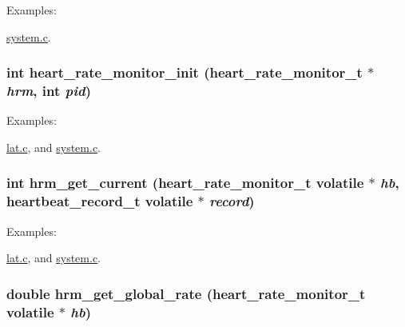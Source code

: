 \begin{Desc}
\item[Examples: ]\par
\hyperlink{system_8c-example}{system.c}.\end{Desc}
\hypertarget{heart__rate__monitor-file_8c_d49db9e81266e365b06d5c818d7e5b63}{
\subsubsection[heart\_\-rate\_\-monitor\_\-init]{\setlength{\rightskip}{0pt plus 5cm}int heart\_\-rate\_\-monitor\_\-init ({\bf heart\_\-rate\_\-monitor\_\-t} $\ast$ {\em hrm}, \/  int {\em pid})}}
\label{heart__rate__monitor-file_8c_d49db9e81266e365b06d5c818d7e5b63}


\begin{Desc}
\item[Examples: ]\par
\hyperlink{lat_8c-example}{lat.c}, and \hyperlink{system_8c-example}{system.c}.\end{Desc}
\hypertarget{heart__rate__monitor-file_8c_333f4dfca799e511a797559107dea290}{
\subsubsection[hrm\_\-get\_\-current]{\setlength{\rightskip}{0pt plus 5cm}int hrm\_\-get\_\-current ({\bf heart\_\-rate\_\-monitor\_\-t} volatile $\ast$ {\em hb}, \/  {\bf heartbeat\_\-record\_\-t} volatile $\ast$ {\em record})}}
\label{heart__rate__monitor-file_8c_333f4dfca799e511a797559107dea290}


\begin{Desc}
\item[Examples: ]\par
\hyperlink{lat_8c-example}{lat.c}, and \hyperlink{system_8c-example}{system.c}.\end{Desc}
\hypertarget{heart__rate__monitor-file_8c_ddc73b92ee482b42aa7a91ea5fc3672c}{
\subsubsection[hrm\_\-get\_\-global\_\-rate]{\setlength{\rightskip}{0pt plus 5cm}double hrm\_\-get\_\-global\_\-rate ({\bf heart\_\-rate\_\-monitor\_\-t} volatile $\ast$ {\em hb})}}
\label{heart__rate__monitor-file_8c_ddc73b92ee482b42aa7a91ea5fc3672c}


